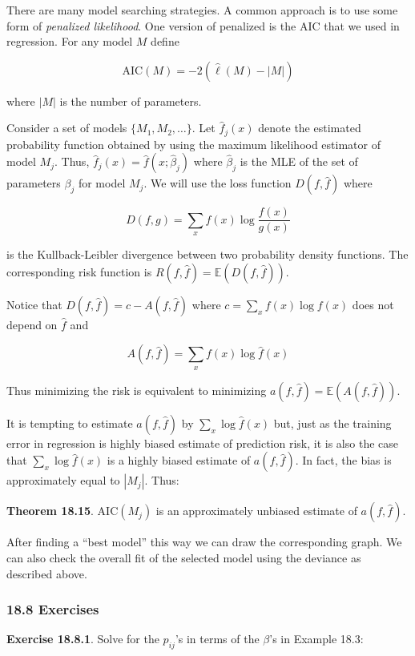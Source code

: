 There are many model searching strategies. A common approach is to use
some form of \emph{penalized likelihood}. One version of penalized is
the AIC that we used in regression. For any model \(M\) define

\[ \text{AIC}(M) = -2 \left( \hat{\ell}(M) - |M|\right) \]

where \(|M|\) is the number of parameters.

Consider a set of models \(\{ M_1, M_2, \dots \}\). Let \(\hat{f}_j(x)\)
denote the estimated probability function obtained by using the maximum
likelihood estimator of model \(M_j\). Thus,
\(\hat{f}_j(x) = \hat{f}(x; \hat{\beta}_j)\) where \(\hat{\beta}_j\) is
the MLE of the set of parameters \(\beta_j\) for model \(M_j\). We will
use the loss function \(D(f, \hat{f})\) where

\[ D(f, g) = \sum_x f(x) \log \frac{f(x)}{g(x)} \]

is the Kullback-Leibler divergence between two probability density
functions. The corresponding risk function is
\(R(f, \hat{f}) = \mathbb{E}(D(f, \hat{f}))\).

Notice that \(D(f, \hat{f}) = c - A(f, \hat{f})\) where
\(c = \sum_x f(x) \log f(x)\) does not depend on \(\hat{f}\) and

\[ A(f, \hat{f}) = \sum_x f(x) \log \hat{f}(x) \]

Thus minimizing the risk is equivalent to minimizing
\(a(f, \hat{f}) = \mathbb{E}(A(f, \hat{f}))\).

It is tempting to estimate \(a(f, \hat{f})\) by
\(\sum_x \log \hat{f}(x)\) but, just as the training error in regression
is highly biased estimate of prediction risk, it is also the case that
\(\sum_x \log \hat{f}(x)\) is a highly biased estimate of
\(a(f, \hat{f})\). In fact, the bias is approximately equal to
\(|M_j|\). Thus:

\textbf{Theorem 18.15}. \(\text{AIC}(M_j)\) is an approximately unbiased
estimate of \(a(f, \hat{f})\).

After finding a ``best model'' this way we can draw the corresponding
graph. We can also check the overall fit of the selected model using the
deviance as described above.

\subsubsection{18.8 Exercises}\label{exercises}

\textbf{Exercise 18.8.1}. Solve for the \(p_{ij}\)'s in terms of the
\(\beta\)'s in Example 18.3:

